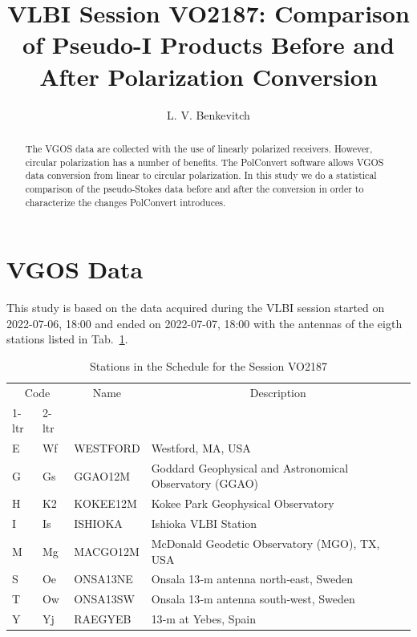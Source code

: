 \documentclass[letterpaper,twoside,12pt]{article}
\title{VLBI Session VO2187: Comparison of Pseudo-I Products Before and After Polarization Conversion}
\author[1]{L. V. Benkevitch}
\affil[1]{\small MIT Haystack observatory, Westford, MA 01886, USA.}
\begin{document}
\maketitle

\begin{abstract}

The VGOS data are collected with the use of linearly polarized receivers. However, circular polarization has a number of benefits. The PolConvert software allows VGOS data conversion from linear to circular polarization. In this study we do a statistical comparison of the pseudo-Stokes data before and after the conversion in order to characterize the changes PolConvert introduces.

\end{abstract}


\tableofcontents

\section{VGOS Data}

This study is based on the data acquired during the VLBI session started on 2022-07-06, 18:00 and ended on 2022-07-07, 18:00 with the antennas of the eigth stations listed in Tab.~\ref{stations}.

\begin{table}[ht!]
  \begin{center}
    \caption{Stations in the Schedule for the Session VO2187}
    \label{stations}
    \begin{tabular}{l|l|l|l}
    \multicolumn{2}{c|}{Code} & \multicolumn{1}{c|}{Name} & \multicolumn{1}{c}{Description} \\                       %
     1-ltr & 2-ltr &  &  \\
      \hline
E & Wf & WESTFORD  & Westford, MA, USA \\
G & Gs & GGAO12M   &	Goddard Geophysical and Astronomical Observatory (GGAO) \\
H & K2 & KOKEE12M  & Kokee Park Geophysical Observatory \\
I & Is & ISHIOKA   & Ishioka VLBI Station \\
M & Mg & MACGO12M  & McDonald Geodetic Observatory (MGO), TX, USA \\
S & Oe & ONSA13NE  & Onsala 13‐m antenna north‐east, Sweden \\
T & Ow & ONSA13SW  & Onsala 13‐m antenna south‐west, Sweden \\
Y & Yj & RAEGYEB   & 13‐m at Yebes, Spain
    \end{tabular}
  \end{center}
\end{table}
  
\end{document}
